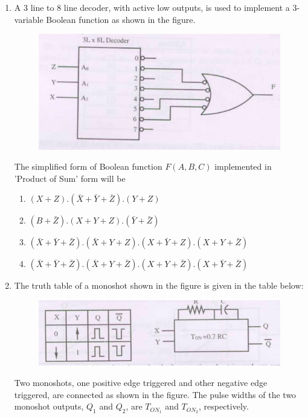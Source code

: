 \documentclass[journal,12pt,onecolumn]{IEEEtran}
\theoremstyle{remark}
\begin{document}
\begin{enumerate}[start=1, label=Q.\arabic*]
\item A $3$ line to $8$ line decoder, with active low outputs, is used to implement a 3-variable Boolean function as shown in the figure.

\begin{figure}[H]
    \centering
    \includegraphics[width=\columnwidth]{Fig/q43.png}
\end{figure}

The simplified form of Boolean function $F(A,B,C)$ implemented in 'Product of Sum' form will be


\begin{enumerate}[label=(\Alph*)]
    \item $(X+Z).(\bar{X}+\bar{Y}+\bar{Z}).(Y+Z)$
    \item $(B+\bar{Z}).(X+Y+Z).(\bar{Y}+\bar{Z})$
    \item $(\bar{X}+\bar{Y}+\bar{Z}).(\bar{X}+Y+Z).(X+\bar{Y}+Z).(X+Y+\bar{Z})$
    \item $(\bar{X}+\bar{Y}+\bar{Z}).(\bar{X}+Y+\bar{Z}).(X+Y+\bar{Z}).(X+\bar{Y}+\bar{Z})$
\end{enumerate}


\item  The truth table of a monoshot shown in the figure is given in the table below:
\begin{figure}[H]
    \centering
    \includegraphics[width=\columnwidth]{Fig/q44.png}
    \label{fig:placeholder}
\end{figure}

Two monoshots, one positive edge triggered and other negative edge triggered, are connected as shown in the figure. The pulse widths of the two monoshot outputs, $Q_1$ and $Q_2$, are $T_{ON_1}$ and $T_{ON_2}$, respectively.


\end{enumerate}
\end{document}
